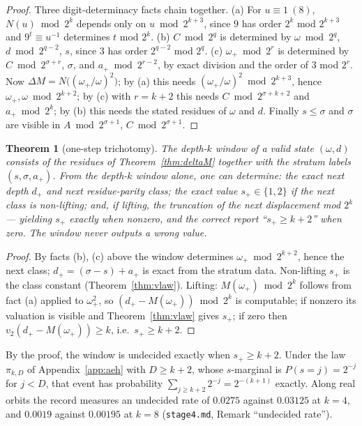 \documentclass[11pt]{article}
\newtheorem{theorem}{Theorem}[section]
\theoremstyle{remark}
\newcommand{\vt}[1]{v_2\!\left(#1\right)}
\newcommand{\w}{\omega}
\newcommand{\wnext}{\w_{+}}
\newcommand{\dnext}{d_{+}}
\begin{document}
\begin{proof}
Three digit-determinacy facts chain together. (a) For $u \equiv 1\ (8)$, $N(u) \bmod 2^k$ depends only on $u \bmod 2^{k+3}$, since $9$ has order $2^k$ mod $2^{k+3}$ and $9^t \equiv u^{-1}$ determines $t$ mod $2^k$. (b) $C \bmod 2^{q}$ is determined by $\w \bmod 2^q$, $d \bmod 2^{q-2}$, $s$, since $3$ has order $2^{q-2}$ mod $2^q$. (c) $\wnext \bmod 2^r$ is determined by $C \bmod 2^{\sigma + r}$, $\sigma$, and $a_+ \bmod 2^{r-2}$, by exact division and the order of $3$ mod $2^r$. Now $\Delta M = N\bigl((\wnext/\w)^2\bigr)$; by (a) this needs $(\wnext/\w)^2 \bmod 2^{k+3}$, hence $\wnext, \w \bmod 2^{k+2}$; by (c) with $r = k+2$ this needs $C \bmod 2^{\sigma+k+2}$ and $a_+ \bmod 2^k$; by (b) this needs the stated residues of $\w$ and $d$. Finally $s \le \sigma$ and $\sigma$ are visible in $A \bmod 2^{\sigma+1}$, $C \bmod 2^{\sigma+1}$.
\end{proof}

\begin{theorem}[one-step trichotomy]\label{thm:onestep}
The \emph{depth-$k$ window} of a valid state $(\w,d)$ consists of the residues of Theorem~\ref{thm:deltaM} together with the stratum labels $(s, \sigma, a_+)$. From the depth-$k$ window alone, one can determine: the exact next depth $\dnext$ and next residue-parity class; the exact value $s_+ \in \{1,2\}$ if the next class is non-lifting; and, if lifting, the truncation of the next displacement mod $2^k$ --- yielding $s_+$ exactly when nonzero, and the correct report ``$s_+ \ge k+2$'' when zero. The window never outputs a wrong value.
\end{theorem}

\begin{proof}
By facts (b), (c) above the window determines $\wnext \bmod 2^{k+2}$, hence the next class; $\dnext = (\sigma - s) + a_+$ is exact from the stratum data. Non-lifting $s_+$ is the class constant (Theorem~\ref{thm:vlaw}). Lifting: $M(\wnext) \bmod 2^k$ follows from fact (a) applied to $\wnext^2$, so $(\dnext - M(\wnext)) \bmod 2^k$ is computable; if nonzero its valuation is visible and Theorem~\ref{thm:vlaw} gives $s_+$; if zero then $\vt{\dnext - M(\wnext)} \ge k$, i.e.\ $s_+ \ge k + 2$.
\end{proof}

By the proof, the window is undecided exactly when $s_+ \ge k+2$. Under the law $\pi_{k,D}$ of Appendix~\ref{app:aeh} with $D \ge k+2$, whose $s$-marginal is $P(s = j) = 2^{-j}$ for $j < D$, that event has probability $\sum_{j \ge k+2} 2^{-j} = 2^{-(k+1)}$ exactly. Along real orbits the record measures an undecided rate of $0.0275$ against $0.03125$ at $k = 4$, and $0.0019$ against $0.00195$ at $k = 8$ (\texttt{stage4.md}, Remark ``undecided rate'').
\end{document}
